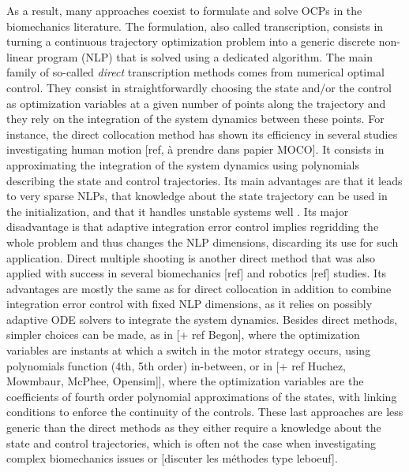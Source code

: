 As a result, many approaches coexist to formulate and solve OCPs in the biomechanics literature. 
The formulation, also called transcription, consists in turning a continuous trajectory optimization problem into a generic discrete non-linear program (NLP) that is solved using a dedicated algorithm. 
The main family of so-called \textit{direct} transcription methods comes from numerical optimal control. 
They consist in straightforwardly choosing the state and/or the control as optimization variables at a given number of points along the trajectory and they rely on the integration of the system dynamics between these points. 
For instance, the direct collocation method has shown its efficiency in several studies investigating human motion [ref, à prendre dans papier MOCO]. 
It consists in approximating the integration of the system dynamics using polynomials describing the state and control trajectories.
Its main advantages are that it leads to very sparse NLPs, that knowledge about the state trajectory can be used in the initialization, and that it handles unstable systems well \cite{diehl2006fast}. 
Its major disadvantage is that adaptive integration error control implies regridding the whole problem and thus changes the NLP dimensions, discarding its use for such application.
Direct multiple shooting is another direct method that was also applied with success in several biomechanics [ref] and robotics [ref] studies.
Its advantages are mostly the same as for direct collocation in addition to combine integration error control with fixed NLP dimensions, as it relies on possibly adaptive ODE solvers to integrate the system dynamics.
Besides direct methods, simpler choices can be made, as in \cite{yeadon2000mechanics} [+ ref Begon], where the optimization variables are instants at which a switch in the motor strategy occurs, using polynomials function (4th, 5th order) in-between, or in \cite{leboeuf2006energetic} [+ ref  Huchez, Mowmbaur, McPhee, Opensim]], where the optimization variables are the coefficients of fourth order polynomial approximations of the states, with linking conditions to enforce the continuity of the controls. 
These last approaches are less generic than the direct methods as they either require a knowledge about the state and control trajectories, which is often not the case when investigating complex biomechanics issues or [discuter les méthodes type leboeuf]. 

